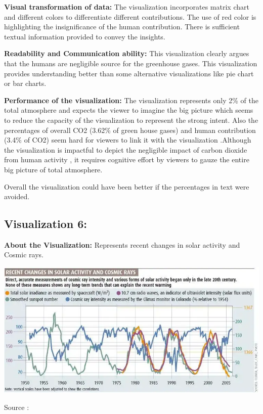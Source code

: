 \documentclass[]{book}
\begin{document}
\textbf{Visual transformation of data:} The visualization incorporates matrix chart and different colors to differentiate different contributions. The use of red color is highlighting the insignificance of the human contribution. There is sufficient textual information provided to convey the insights.

\textbf{Readability and Communication ability:} This visualization clearly argues that the humans are negligible source for the greenhouse gases. This visualization provides understanding better than some alternative visualizations like pie chart or bar charts.

\textbf{Performance of the visualization:} The visualization represents only 2\% of the total atmosphere and expects the viewer to imagine the big picture which seems to reduce the capacity of the visualization to represent the strong intent. Also the percentages of overall CO2 (3.62\% of green house gases) and human contribution (3.4\% of CO2) seem hard for viewers to link it with the visualization .Although the visualization is impactful to depict the negligible impact of carbon dioxide from human activity , it requires cognitive effort by viewers to gauze the entire big picture of total atmosphere.

Overall the visualization could have been better if the percentages in text were avoided.

\hypertarget{visualization-6}{%
\subsection{Visualization 6:}\label{visualization-6}}

\textbf{About the Visualization:} Represents recent changes in solar activity and Cosmic rays.

\includegraphics{images/Vz7.png}

Source :\citep{ClimateMyth}
\end{document}
